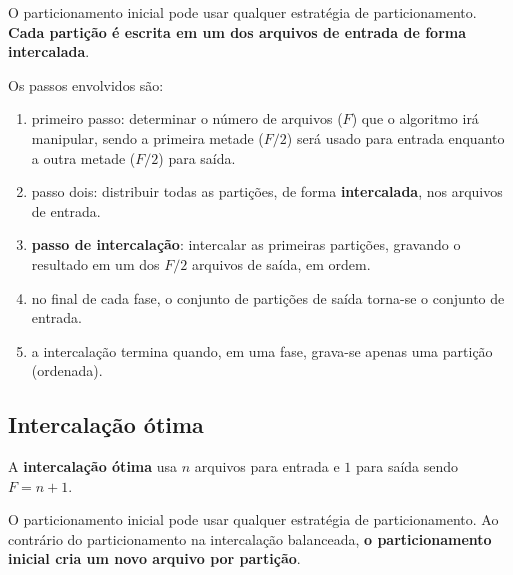O particionamento inicial pode usar qualquer estratégia de particionamento.
{\bf Cada partição é escrita em um dos arquivos de entrada de forma intercalada}.

Os passos envolvidos são:
\begin{enumerate}
\item primeiro passo: determinar o número de arquivos ($F$) que o algoritmo irá
manipular, sendo a primeira metade ($F/2$) será usado para entrada enquanto
a outra metade ($F/2$) para saída.

\item passo dois: distribuir todas as partições, de forma {\bf intercalada},
nos arquivos de entrada.

\item {\bf passo de intercalação}: intercalar as primeiras partições,
gravando o resultado em um dos $F/2$ arquivos de saída, em ordem.

\item no final de cada fase, o conjunto de partições de saída
torna-se o conjunto de entrada.

\item a intercalação termina quando, em uma fase, grava-se apenas uma partição
(ordenada).
\end{enumerate}

\subsection{Intercalação ótima}

A {\bf intercalação ótima} usa $n$ arquivos para entrada e $1$ para saída
sendo $F = n + 1$.

O particionamento inicial pode usar qualquer estratégia de particionamento.
Ao contrário do particionamento na intercalação balanceada, {\bf o particionamento
inicial cria um novo arquivo por partição}.

